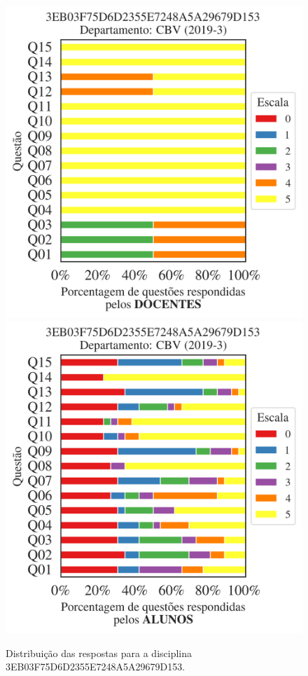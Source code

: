 \documentclass[a4paper,10pt]{article}
\begin{document}
\begin{figure}[h]
\centering
\includegraphics[width=0.485\linewidth]{analise_disciplina_departamento_CBV_3EB03F75D6D2355E7248A5A29679D153_docentes.png}
\includegraphics[width=0.485\linewidth]{analise_disciplina_departamento_CBV_3EB03F75D6D2355E7248A5A29679D153_alunos.png}
\caption{\label{fig:analise_geral_departamento}                Distribuição das respostas para a disciplina 3EB03F75D6D2355E7248A5A29679D153. }
\end{figure}
\end{document}
